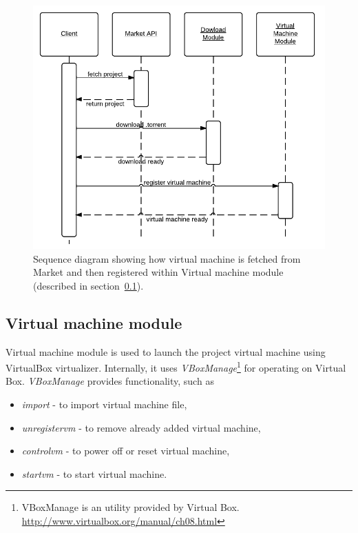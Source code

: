 \begin{figure}
\centering
\includegraphics{diagrams/ClientProjectDownload.pdf}
\caption{Sequence diagram showing how virtual machine is fetched from Market and then registered within Virtual machine module (described in section~\ref{s:c_vm_mod}).}
\label{f:clientprojdownload}
\end{figure}

\subsection{Virtual machine module}

\label{s:c_vm_mod}

Virtual machine module is used to launch the project virtual machine using VirtualBox virtualizer. Internally, it uses \emph{VBoxManage}\footnote{VBoxManage is an utility provided by Virtual Box. \url{http://www.virtualbox.org/manual/ch08.html}} for operating on Virtual Box. \emph{VBoxManage} provides functionality, such as

\begin{itemize}
\item \emph{import} - to import virtual machine file,
\item \emph{unregistervm} - to remove already added virtual machine,
\item \emph{controlvm} - to power off or reset virtual machine,
\item \emph{startvm} - to start virtual machine.
\end{itemize}

